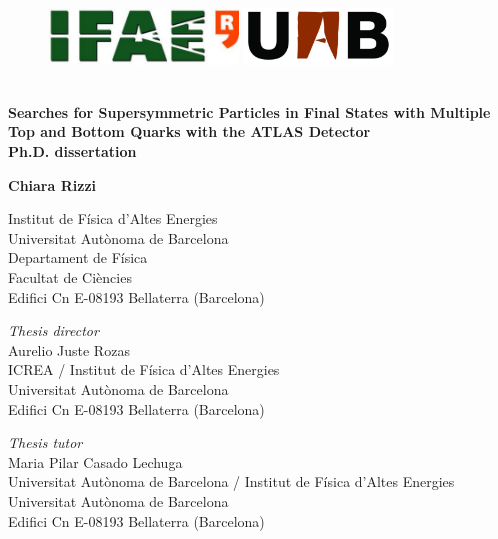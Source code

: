 \begin{titlepage}
\begin{center}

\begin{figure}[h!]
\includegraphics[height=15mm]{figures/front/IFAE_logo-eps-converted-to.pdf}
\hfill
\includegraphics[height=15mm]{figures/front/uab_logo-eps-converted-to.pdf}
\end{figure}
 
\vspace{0.5cm}
\HRule\\
\vspace{0.2cm}
{\huge \bf Searches for Supersymmetric Particles in Final States with Multiple Top and Bottom Quarks with the ATLAS Detector\\
\vspace{1cm}
Ph.D. dissertation}
\HRule\\
\par
\vspace{1.5in}
 
{\LARGE \bf Chiara Rizzi}
\vspace{0.3cm}
\par
Institut de F\'{i}sica d'Altes Energies\\
Universitat Aut\`{o}noma de Barcelona\\
Departament de F\'{i}sica\\
Facultat de Ci\`{e}ncies \\
Edifici Cn E-08193 Bellaterra (Barcelona)
\par
\vspace{0.5in}
 
 
\vfill
{\it Thesis director}\\
Aurelio Juste Rozas\\
ICREA / Institut de F\'{i}sica d'Altes Energies\\
Universitat Aut\`{o}noma de Barcelona\\
Edifici Cn E-08193 Bellaterra (Barcelona)

\vfill
{\it Thesis tutor}\\
Maria Pilar Casado Lechuga\\
Universitat Aut\`{o}noma de Barcelona / Institut de F\'{i}sica d'Altes Energies\\
Universitat Aut\`{o}noma de Barcelona\\
Edifici Cn E-08193 Bellaterra (Barcelona)

\end{center}
\end{titlepage}
